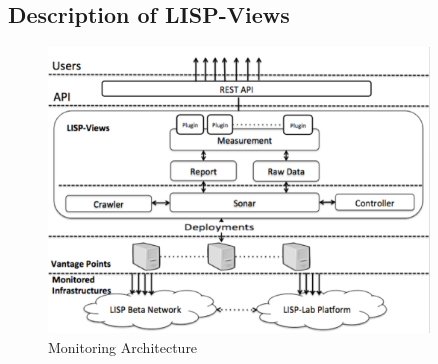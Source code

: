 \subsection{Description of LISP-Views}
\label{sec:lispviews_archi_description}

\begin{figure}[!t]
     \centering
     \includegraphics[width=0.9\textwidth]{Pics/LISP-Views_Arch.eps}
     \caption{Monitoring Architecture}
     \label{monitoring_arch}
\end{figure}

